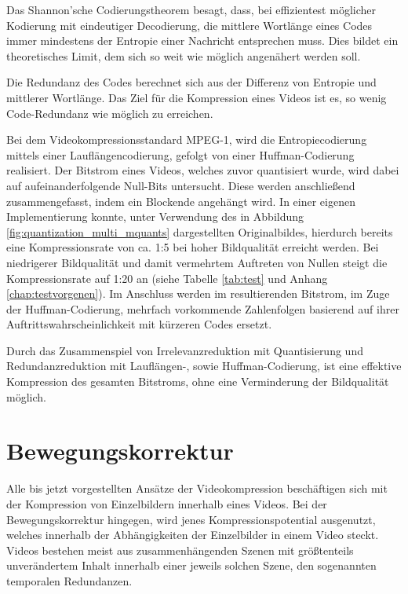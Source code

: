 Das Shannon'sche Codierungstheorem besagt, dass, bei effizientest möglicher Kodierung mit eindeutiger Decodierung, die mittlere Wortlänge eines Codes immer mindestens der Entropie einer Nachricht entsprechen muss. Dies bildet ein theoretisches Limit, dem sich so weit wie möglich angenähert werden soll.

Die Redundanz des Codes berechnet sich aus der Differenz von Entropie und mittlerer Wortlänge. Das Ziel für die Kompression eines Videos ist es, so wenig Code-Redundanz wie möglich zu erreichen.

Bei dem Videokompressionsstandard MPEG-1, wird die Entropiecodierung mittels einer Lauflängencodierung, gefolgt von einer Huffman-Codierung realisiert. Der Bitstrom eines Videos, welches zuvor quantisiert wurde, wird dabei auf aufeinanderfolgende Null-Bits untersucht. Diese werden anschließend zusammengefasst, indem ein Blockende angehängt wird.
In einer eigenen Implementierung konnte, unter Verwendung des in Abbildung \ref{fig:quantization_multi_mquants} dargestellten Originalbildes, hierdurch bereits eine Kompressionsrate von ca. 1:5 bei hoher Bildqualität erreicht werden. Bei niedrigerer Bildqualität und damit vermehrtem Auftreten von Nullen steigt die Kompressionsrate auf 1:20 an (siehe Tabelle \ref{tab:test} und Anhang \ref{chap:testvorgenen}).
Im Anschluss werden im resultierenden Bitstrom, im Zuge der Huffman-Codierung, mehrfach vorkommende Zahlenfolgen basierend auf ihrer Auftrittswahrscheinlichkeit mit kürzeren Codes ersetzt.

Durch das Zusammenspiel von Irrelevanzreduktion mit Quantisierung und Redundanzreduktion mit Lauflängen-, sowie Huffman-Codierung, ist eine effektive Kompression des gesamten Bitstroms, ohne eine Verminderung der Bildqualität möglich.

\section{Bewegungskorrektur}
Alle bis jetzt vorgestellten Ansätze der Videokompression beschäftigen sich mit der Kompression von Einzelbildern innerhalb eines Videos. Bei der Bewegungskorrektur hingegen, wird jenes Kompressionspotential ausgenutzt, welches innerhalb der Abhängigkeiten der Einzelbilder in einem Video steckt.
Videos bestehen meist aus zusammenhängenden Szenen mit größtenteils unverändertem Inhalt innerhalb einer jeweils solchen Szene, den sogenannten temporalen Redundanzen.

